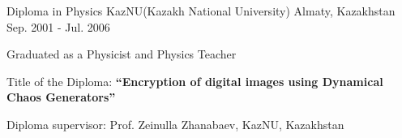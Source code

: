 \begin{cventries}  
  \cventry
    {Diploma in Physics}
    {KazNU(Kazakh National University)}
    {Almaty, Kazakhstan}
    {Sep. 2001 - Jul. 2006}
    {
      \begin{cvitems}
        \item {Graduated as a Physicist and Physics Teacher}
        \item {Title of the Diploma: {\bf{“Encryption of digital images using Dynamical Chaos Generators”}}}
        \item {Diploma supervisor: Prof. Zeinulla Zhanabaev, KazNU, Kazakhstan}
      \end{cvitems}
    }
\end{cventries}
